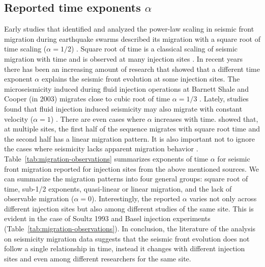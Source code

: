 \documentclass[draft]{agujournal2019}
\begin{document}
\subsection{Reported time exponents $\alpha$}

Early studies that identified and analyzed the power-law scaling in seismic front migration during earthquake swarms described its migration with a square root of time scaling ($\alpha=1/2$) \cite{ShapiroEtAl1997, ShapiroEtAl2002}.
Square root of time is a classical scaling of seismic migration with time and is observed at many injection sites \cite{GoebelBrodsky2018}.
In recent years there has been an increasing amount of research that showed that a different time exponent $\alpha$ explains the seismic front evolution at some injection sites.
The microseismicity induced during fluid injection operations at Barnett Shale and Cooper (in 2003) migrates close to cubic root of time $\alpha = 1 /3$ \cite{ShapiroDinske2009, JohannEtAl2016}.
Lately, studies found that fluid injection induced seismicity may also migrate with constant velocity ($\alpha=1$) \cite{LenglineEtAl2017, GoebelBrodsky2018, DanreEtAl2024}.
There are even cases where $\alpha$ increases with time. \cite{DeBarrosEtAl2021} showed that, at multiple sites, the first half of the sequence migrates with square root time and the second half has a linear migration pattern.
It is also important not to ignore the cases where seismicity lacks apparent migration behavior \cite{DuboeufEtAl2017, GoebelBrodsky2018}.
Table~\ref{tab:migration-observations} summarizes exponents of time $\alpha$ for seismic front migration reported for injection sites from the above mentioned sources. We can summarize the migration patterns into four general groups: square root of time, sub-1/2 exponents, quasi-linear or linear migration, and the lack of observable migration ($\alpha=0$). Interestingly, the reported $\alpha$ varies not only across different injection sites but also among different studies of the same site. This is evident in the case of Soultz 1993 and Basel injection experiments (Table~\ref{tab:migration-observations}). In conclusion, the literature of the analysis on seismicity migration data suggests that the seismic front evolution does not follow a single relationship in time, instead it changes with different injection sites and even among different researchers for the same site.
\end{document}

